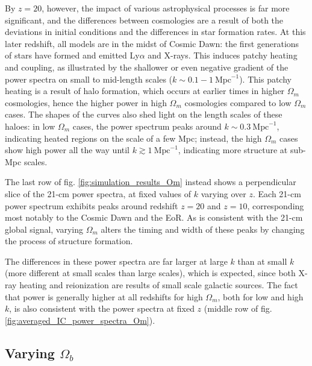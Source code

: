 \documentclass[floats,floatfix,showpacs,amssymb,prd,superscriptaddress,nofootinbib]{revtex4-2} %
\begin{document}
By $z = 20$, however, the impact of various astrophysical processes is far more significant, and the differences between cosmologies are a result of both the deviations in initial conditions and the differences in star formation rates. At this later redshift, all models are in the midst of Cosmic Dawn: the first generations of stars have formed and emitted Ly$\alpha$ and X-rays. This induces patchy heating and coupling, as illustrated by the shallower or even negative gradient of the power spectra on small to mid-length scales ($k \sim 0.1 - 1 ~\text{Mpc}^{-1}$). This patchy heating is a result of halo formation, which occurs at earlier times in higher $\Omega_m$ cosmologies, hence the higher power in high $\Omega_m$ cosmologies compared to low $\Omega_m$ cases. The shapes of the curves also shed light on the length scales of these haloes: in low $\Omega_m$ cases, the power spectrum peaks around $k \sim 0.3 ~\text{Mpc}^{-1}$, indicating heated regions on the scale of a few Mpc; instead, the high $\Omega_m$ cases show high power all the way until $k \gtrsim 1 ~\text{Mpc}^{-1}$, indicating more structure at sub-Mpc scales. 



The last row of fig. \ref{fig:simulation_results_Om} instead shows a perpendicular slice of the 21-cm power spectra, at fixed values of $k$ varying over $z$. Each 21-cm power spectrum exhibits peaks around redshift $z = 20$ and $z = 10$, corresponding most notably to the Cosmic Dawn and the EoR. As is consistent with the 21-cm global signal, varying $\Omega_m$ alters the timing and width of these peaks by changing the process of structure formation.


The differences in these power spectra are far larger at large $k$ than at small $k$ (more different at small scales than large scales), which is expected, since both X-ray heating and reionization are results of small scale galactic sources. The fact that power is generally higher at all redshifts for high $\Omega_m$, both for low and high $k$, is also consistent with the power spectra at fixed $z$ (middle row of fig. \ref{fig:averaged_IC_power_spectra_Om}).


\subsection{Varying $\Omega_b$}
\end{document}
